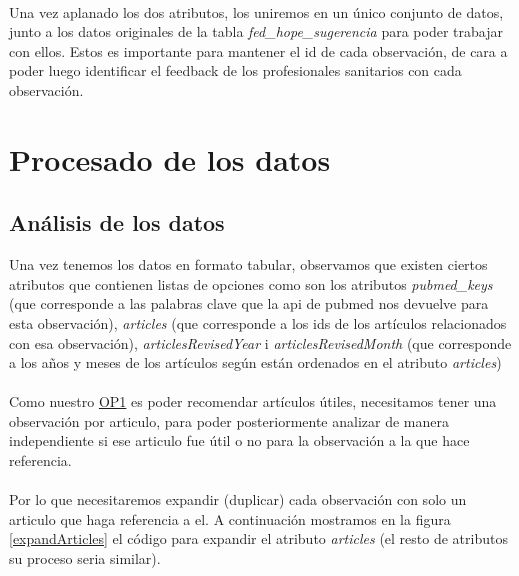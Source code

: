 \documentclass[10pt,a4paper,oneside]{book}
\begin{document}
\paragraph{}
Una vez aplanado los dos atributos, los uniremos en un único conjunto de datos, junto a los datos originales de la tabla \textit{fed\_hope\_sugerencia} para poder trabajar con ellos. Estos es importante para mantener el id de cada observación, de cara a poder luego identificar el feedback de los profesionales sanitarios con cada observación.

\newpage
\section{Procesado de los datos}

\subsection{Análisis de los datos}
Una vez tenemos los datos en formato tabular, observamos que existen ciertos atributos que contienen listas de opciones como son los atributos \textit{pubmed\_keys} (que corresponde a las palabras clave que la api de pubmed nos devuelve para esta observación), \textit{articles} (que corresponde a los ids de los artículos relacionados con esa observación), \textit{articlesRevisedYear} i \textit{articlesRevisedMonth} (que corresponde a los años y meses de los artículos según están ordenados en el atributo \textit{articles})

\paragraph{}
Como nuestro \hyperref[op:OP1]{OP1} es poder recomendar artículos útiles, necesitamos tener una observación por articulo, para poder posteriormente analizar de manera independiente si ese articulo fue útil o no para la observación a la que hace referencia.

\paragraph{}
Por lo que necesitaremos expandir (duplicar) cada observación con solo un articulo que haga referencia a el. A continuación mostramos en la figura \ref{expandArticles} el código para expandir el atributo \textit{articles} (el resto de atributos su proceso seria similar).
\end{document}

